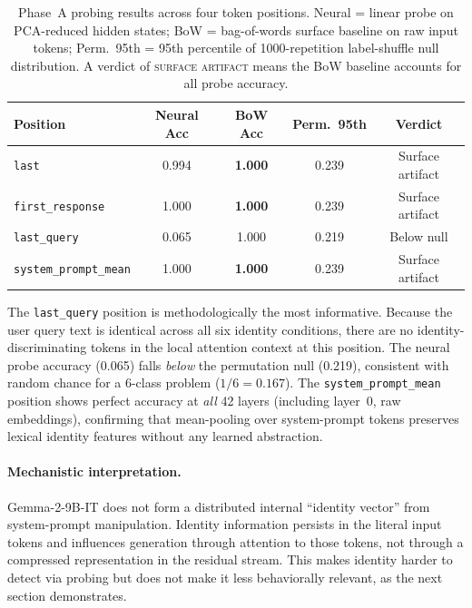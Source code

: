 \documentclass[11pt,a4paper]{article}
\newcommand{\gemma}{Gemma-2-9B-IT}
\begin{document}
\begin{table}[t]
\centering
\caption{Phase~A probing results across four token positions. Neural = linear
probe on PCA-reduced hidden states; BoW = bag-of-words surface baseline on raw
input tokens; Perm.\ 95th = 95th percentile of 1000-repetition
label-shuffle null distribution. A verdict of \textsc{surface artifact} means
the BoW baseline accounts for all probe accuracy.}
\label{tab:probing}
\smallskip
\begin{tabular}{@{}lcccc@{}}
\toprule
Position & Neural Acc & BoW Acc & Perm.\ 95th & Verdict \\
\midrule
\texttt{last}                & 0.994 & \textbf{1.000} & 0.239 & Surface artifact \\
\texttt{first\_response}      & 1.000 & \textbf{1.000} & 0.239 & Surface artifact \\
\texttt{last\_query}          & 0.065 & 1.000           & 0.219 & Below null \\
\texttt{system\_prompt\_mean} & 1.000 & \textbf{1.000} & 0.239 & Surface artifact \\
\bottomrule
\end{tabular}
\end{table}

The \texttt{last\_query} position is methodologically the most informative.
Because the user query text is identical across all six identity conditions,
there are no identity-discriminating tokens in the local attention context at
this position. The neural probe accuracy (0.065) falls \emph{below} the
permutation null (0.219), consistent with random chance for a 6-class problem
($1/6 = 0.167$). The \texttt{system\_prompt\_mean} position shows perfect
accuracy at \emph{all} 42 layers (including layer~0, raw embeddings),
confirming that mean-pooling over system-prompt tokens preserves lexical
identity features without any learned abstraction.

\paragraph{Mechanistic interpretation.} \gemma{} does not form a distributed
internal ``identity vector'' from system-prompt manipulation. Identity
information persists in the literal input tokens and influences generation
through attention to those tokens, not through a compressed representation in
the residual stream. This makes identity harder to detect via probing but does
not make it less behaviorally relevant, as the next section demonstrates.
\end{document}
